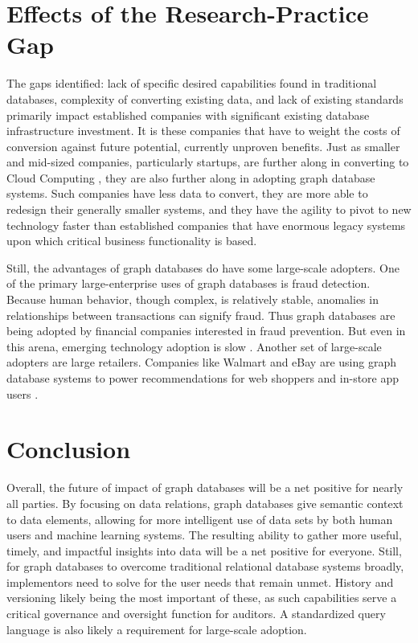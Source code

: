\section{Effects of the Research-Practice Gap}

The gaps identified: lack of specific desired capabilities found in traditional databases, complexity of converting existing data, and lack of existing standards primarily impact established companies with significant existing database infrastructure investment. It is these companies that have to weight the costs of conversion against future potential, currently unproven benefits. Just as smaller and mid-sized companies, particularly startups, are further along in converting to Cloud Computing \parencite{karunagaranDifferentialCloudAdoption2019}, they are also further along in adopting graph database systems. Such companies have less data to convert, they are more able to redesign their generally smaller systems, and they have the agility to pivot to new technology faster than established companies that have enormous legacy systems upon which critical business functionality is based.

Still, the advantages of graph databases do have some large-scale adopters. One of the primary large-enterprise uses of graph databases is fraud detection. Because human behavior, though complex, is relatively stable, anomalies in relationships between transactions can signify fraud. Thus graph databases are being adopted by financial companies interested in fraud prevention. But even in this arena, emerging technology adoption is slow  \parencite{mackeyInterdisciplinaryReviewDigital2020}. Another set of large-scale adopters are large retailers. Companies like Walmart and eBay are using graph database systems to power recommendations for web shoppers and in-store app users \parencite{webberTopUseCases2017}.

\section{Conclusion}

Overall, the future of impact of graph databases will be a net positive for nearly all parties. By focusing on data relations, graph databases give semantic context to data elements, allowing for more intelligent use of data sets by both human users and machine learning systems. The resulting ability to gather more useful, timely, and impactful insights into data will be a net positive for everyone. Still, for graph databases to overcome traditional relational database systems broadly, implementors need to solve for the user needs that remain unmet. History and versioning likely being the most important of these, as such capabilities serve a critical governance and oversight function for auditors. A standardized query language is also likely a requirement for large-scale adoption.
